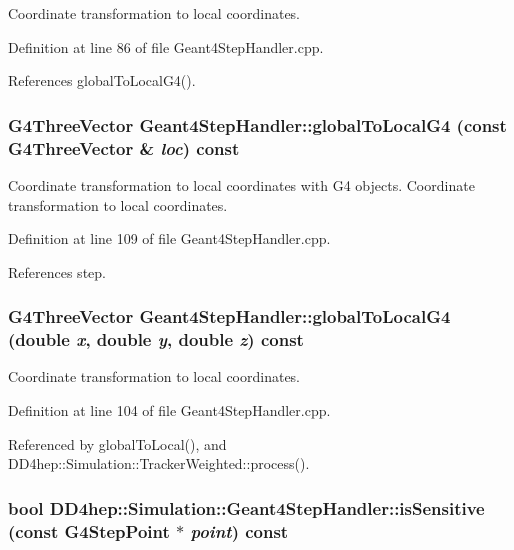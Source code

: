 Coordinate transformation to local coordinates. 

Definition at line 86 of file Geant4StepHandler.cpp.

References globalToLocalG4().\hypertarget{class_d_d4hep_1_1_simulation_1_1_geant4_step_handler_a1a0e03eb5215e033eb98538e6c963d6f}{
\subsubsection[{globalToLocalG4}]{\setlength{\rightskip}{0pt plus 5cm}G4ThreeVector Geant4StepHandler::globalToLocalG4 (const G4ThreeVector \& {\em loc}) const}}
\label{class_d_d4hep_1_1_simulation_1_1_geant4_step_handler_a1a0e03eb5215e033eb98538e6c963d6f}


Coordinate transformation to local coordinates with G4 objects. Coordinate transformation to local coordinates. 

Definition at line 109 of file Geant4StepHandler.cpp.

References step.\hypertarget{class_d_d4hep_1_1_simulation_1_1_geant4_step_handler_ad08f4724ef8345d764de6313d1e121fa}{
\subsubsection[{globalToLocalG4}]{\setlength{\rightskip}{0pt plus 5cm}G4ThreeVector Geant4StepHandler::globalToLocalG4 (double {\em x}, \/  double {\em y}, \/  double {\em z}) const}}
\label{class_d_d4hep_1_1_simulation_1_1_geant4_step_handler_ad08f4724ef8345d764de6313d1e121fa}


Coordinate transformation to local coordinates. 

Definition at line 104 of file Geant4StepHandler.cpp.

Referenced by globalToLocal(), and DD4hep::Simulation::TrackerWeighted::process().\hypertarget{class_d_d4hep_1_1_simulation_1_1_geant4_step_handler_ac3fdad18d7737b2c7b44969ccba8cb24}{
\subsubsection[{isSensitive}]{\setlength{\rightskip}{0pt plus 5cm}bool DD4hep::Simulation::Geant4StepHandler::isSensitive (const G4StepPoint $\ast$ {\em point}) const}}
\label{class_d_d4hep_1_1_simulation_1_1_geant4_step_handler_ac3fdad18d7737b2c7b44969ccba8cb24}


